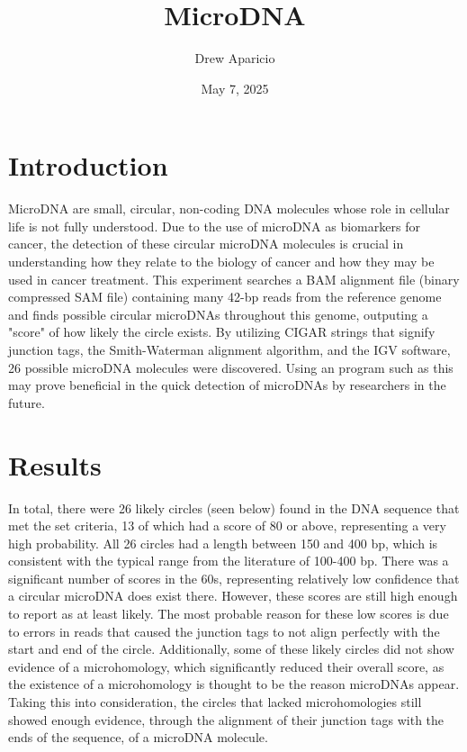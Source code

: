 \documentclass[11pt, letterpaper]{article}
\begin{document}
\title{MicroDNA}
\author{Drew Aparicio}
\date{May 7, 2025}
\maketitle

\section{Introduction}
MicroDNA are small, circular, non-coding DNA molecules whose role in cellular life is not fully understood. Due to the use of microDNA as biomarkers for cancer, the detection of these circular microDNA molecules is crucial in understanding how they relate to the biology of cancer and how they may be used in cancer treatment. This experiment searches a BAM alignment file (binary compressed SAM file) containing many 42-bp reads from the reference genome and finds possible circular microDNAs throughout this genome, outputing a "score" of how likely the circle exists. By utilizing CIGAR strings that signify junction tags, the Smith-Waterman alignment algorithm, and the IGV software, 26 possible microDNA molecules were discovered. Using an program such as this may prove beneficial in the quick detection of microDNAs by researchers in the future.


\section{Results}
In total, there were 26 likely circles (seen below) found in the DNA sequence that met the set criteria, 13 of which had a score of 80 or above, representing a very high probability. All 26 circles had a length between 150 and 400 bp, which is consistent with the typical range from the literature of 100-400 bp. There was a significant number of scores in the 60s, representing relatively low confidence that a circular microDNA does exist there. However, these scores are still high enough to report as at least likely. The most probable reason for these low scores is due to errors in reads that caused the junction tags to not align perfectly with the start and end of the circle. Additionally, some of these likely circles did not show evidence of a microhomology, which significantly reduced their overall score, as the existence of a microhomology is thought to be the reason microDNAs appear. Taking this into consideration, the circles that lacked microhomologies still showed enough evidence, through the alignment of their junction tags with the ends of the sequence, of a microDNA molecule. 
\end{document}
